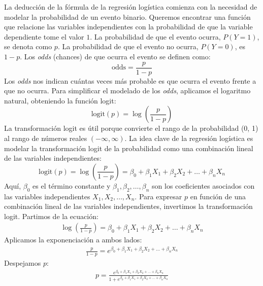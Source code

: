 La deducción de la fórmula de la regresión logística comienza con la necesidad de modelar la probabilidad de un evento binario. Queremos encontrar una función que relacione las variables independientes con la probabilidad de que la variable dependiente tome el valor $1$. La probabilidad de que el evento ocurra, $P(Y=1)$, se denota como $p$. La probabilidad de que el evento no ocurra, $P(Y=0)$, es $1-p$. Los \textit{odds} (chances) de que ocurra el evento se definen como:
\begin{equation}
\text{odds} = \frac{p}{1-p}
\end{equation}
Los \textit{odds} nos indican cuántas veces más probable es que ocurra el evento frente a que no ocurra. Para simplificar el modelado de los \textit{odds}, aplicamos el logaritmo natural, obteniendo la función logit:
\begin{equation}
\text{logit}(p) = \log\left(\frac{p}{1-p}\right)
\end{equation}
La transformación logit es útil porque convierte el rango de la probabilidad (0, 1) al rango de números reales $\left(-\infty, \infty\right)$. La idea clave de la regresión logística es modelar la transformación logit de la probabilidad como una combinación lineal de las variables independientes:
\begin{equation}
\text{logit}(p) = \log\left(\frac{p}{1-p}\right) = \beta_0 + \beta_1 X_1 + \beta_2 X_2 + \ldots + \beta_n X_n
\end{equation}
Aquí, $\beta_0$ es el t\'ermino constante y $\beta_1, \beta_2, \ldots, \beta_n$ son los coeficientes asociados con las variables independientes $X_1, X_2, \ldots, X_n$. Para expresar $p$ en función de una combinación lineal de las variables independientes, invertimos la transformación logit. Partimos de la ecuación:
\begin{eqnarray*}
\log\left(\frac{p}{1-p}\right) = \beta_0 + \beta_1 X_1 + \beta_2 X_2 + \ldots + \beta_n X_n
\end{eqnarray*}
Aplicamos la exponenciación a ambos lados:
\begin{eqnarray*}
\frac{p}{1-p} = e^{\beta_0 + \beta_1 X_1 + \beta_2 X_2 + \ldots + \beta_n X_n}
\end{eqnarray*}
Despejamos $p$:
\begin{eqnarray*}
p = \frac{e^{\beta_0 + \beta_1 X_1 + \beta_2 X_2 + \ldots + \beta_n X_n}}{1 + e^{\beta_0 + \beta_1 X_1 + \beta_2 X_2 + \ldots + \beta_n X_n}}
\end{eqnarray*}


